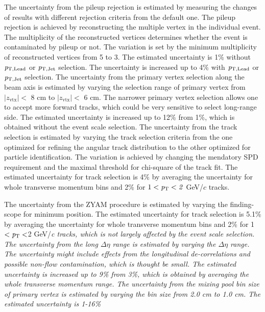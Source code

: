 The uncertainty from the pileup rejection is estimated by measuring the changes of results with different rejection criteria from the default one. The pileup rejection is achieved by reconstructing the multiple vertex in the individual event. The multiplicity of the reconstructed vertices determines whether the event is contaminated by pileup or not. The variation is set by the minimum multiplicity of reconstructed vertices from 5 to 3. 
The estimated uncertainty is 1\% without $\it{p}_{\rm{T, Lead}}$ or $\it{p}_{\rm{T, Jet}}$ selection. The uncertainty is increased up to 4\% with $\it{p}_{\rm{T, Lead}}$ or $\it{p}_{\rm{T, Jet}}$ selection. The uncertainty from the primary vertex selection along the beam axis is estimated by varying the selection range of primary vertex from $|z_\mathrm{vtx}|<$ 8 cm to $|z_\mathrm{vtx}|<$ 6 cm. The narrower primary vertex selection allows one to accept more forward tracks, which could be very sensitive to select long-range side. The estimated uncertainty is increased up to 12\% from 1\%, which is obtained without the event scale selection.
The uncertainty from the track selection is estimated by varying the track selection criteria from the one optimized for refining the angular track distribution to the other optimized for particle identification. The variation is achieved by changing the mendatory SPD requirement and the maximal threshold for chi-square of the track fit.
The estimated uncertainty for track selection is 4\% by averaging the uncertainty for whole transverse momentum bins and 2\% for $1<\it{p}_{\rm{T}}<2$ GeV/$c$ tracks.

The uncertainty from the ZYAM procedure is estimated by varying the finding-scope for minimum position. The estimated uncertainty for track selection is 5.1\% by averaging the uncertainty for whole transverse momentum bins and 2\% for 1$<\it{p}_{\rm{T}}<$2 GeV/\it{c}\rm{} tracks, which is not largely affected by the event scale selection. The uncertainty from the long $\Delta\eta$ range is estimated by varying the $\Delta\eta$ range. The uncertainty might include effects from the longitudinal de-correlations and possible non-flow contamination, which is thought be small. The estimated uncertainty is increased up to 9\% from 3\%, which is obtained by averaging the whole transverse momentum range.
The uncertainty from the mixing pool bin size of primary vertex is estimated by varying the bin size from 2.0 cm to 1.0 cm. The estimated uncertainty is 1-16\%

